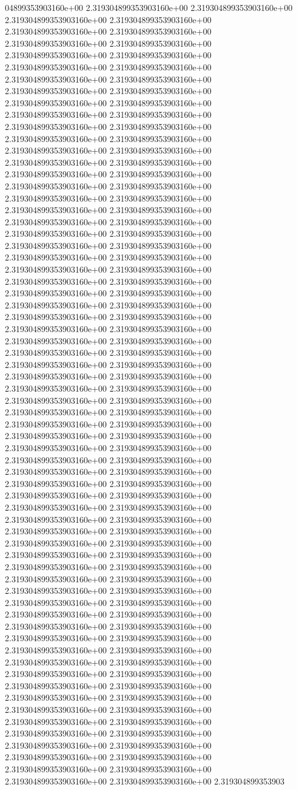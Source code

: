 04899353903160e+00	2.319304899353903160e+00	2.319304899353903160e+00	2.319304899353903160e+00	2.319304899353903160e+00	2.319304899353903160e+00	2.319304899353903160e+00	2.319304899353903160e+00	2.319304899353903160e+00	2.319304899353903160e+00	2.319304899353903160e+00	2.319304899353903160e+00	2.319304899353903160e+00	2.319304899353903160e+00	2.319304899353903160e+00	2.319304899353903160e+00	2.319304899353903160e+00	2.319304899353903160e+00	2.319304899353903160e+00	2.319304899353903160e+00	2.319304899353903160e+00	2.319304899353903160e+00	2.319304899353903160e+00	2.319304899353903160e+00	2.319304899353903160e+00	2.319304899353903160e+00	2.319304899353903160e+00	2.319304899353903160e+00	2.319304899353903160e+00	2.319304899353903160e+00	2.319304899353903160e+00	2.319304899353903160e+00	2.319304899353903160e+00	2.319304899353903160e+00	2.319304899353903160e+00	2.319304899353903160e+00	2.319304899353903160e+00	2.319304899353903160e+00	2.319304899353903160e+00	2.319304899353903160e+00	2.319304899353903160e+00	2.319304899353903160e+00	2.319304899353903160e+00	2.319304899353903160e+00	2.319304899353903160e+00	2.319304899353903160e+00	2.319304899353903160e+00	2.319304899353903160e+00	2.319304899353903160e+00	2.319304899353903160e+00	2.319304899353903160e+00	2.319304899353903160e+00	2.319304899353903160e+00	2.319304899353903160e+00	2.319304899353903160e+00	2.319304899353903160e+00	2.319304899353903160e+00	2.319304899353903160e+00	2.319304899353903160e+00	2.319304899353903160e+00	2.319304899353903160e+00	2.319304899353903160e+00	2.319304899353903160e+00	2.319304899353903160e+00	2.319304899353903160e+00	2.319304899353903160e+00	2.319304899353903160e+00	2.319304899353903160e+00	2.319304899353903160e+00	2.319304899353903160e+00	2.319304899353903160e+00	2.319304899353903160e+00	2.319304899353903160e+00	2.319304899353903160e+00	2.319304899353903160e+00	2.319304899353903160e+00	2.319304899353903160e+00	2.319304899353903160e+00	2.319304899353903160e+00	2.319304899353903160e+00	2.319304899353903160e+00	2.319304899353903160e+00	2.319304899353903160e+00	2.319304899353903160e+00	2.319304899353903160e+00	2.319304899353903160e+00	2.319304899353903160e+00	2.319304899353903160e+00	2.319304899353903160e+00	2.319304899353903160e+00	2.319304899353903160e+00	2.319304899353903160e+00	2.319304899353903160e+00	2.319304899353903160e+00	2.319304899353903160e+00	2.319304899353903160e+00	2.319304899353903160e+00	2.319304899353903160e+00	2.319304899353903160e+00	2.319304899353903160e+00	2.319304899353903160e+00	2.319304899353903160e+00	2.319304899353903160e+00	2.319304899353903160e+00	2.319304899353903160e+00	2.319304899353903160e+00	2.319304899353903160e+00	2.319304899353903160e+00	2.319304899353903160e+00	2.319304899353903160e+00	2.319304899353903160e+00	2.319304899353903160e+00	2.319304899353903160e+00	2.319304899353903160e+00	2.319304899353903160e+00	2.319304899353903160e+00	2.319304899353903160e+00	2.319304899353903160e+00	2.319304899353903160e+00	2.319304899353903160e+00	2.319304899353903160e+00	2.319304899353903160e+00	2.319304899353903160e+00	2.319304899353903160e+00	2.319304899353903160e+00	2.319304899353903160e+00	2.319304899353903160e+00	2.319304899353903160e+00	2.319304899353903160e+00	2.319304899353903160e+00	2.319304899353903160e+00	2.319304899353903160e+00	2.319304899353903160e+00	2.319304899353903